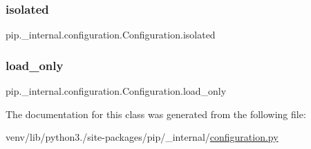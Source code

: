 \subsubsection{\texorpdfstring{isolated}{isolated}}
{\footnotesize\ttfamily pip.\+\_\+internal.\+configuration.\+Configuration.\+isolated}

\mbox{\label{classpip_1_1__internal_1_1configuration_1_1Configuration_a12c133cf8e1ac8bd7438014a7fd26dc7}} 
\subsubsection{\texorpdfstring{load\+\_\+only}{load\_only}}
{\footnotesize\ttfamily pip.\+\_\+internal.\+configuration.\+Configuration.\+load\+\_\+only}



The documentation for this class was generated from the following file\+:\begin{DoxyCompactItemize}
\item 
venv/lib/python3./site-\/packages/pip/\+\_\+internal/\hyperlink{configuration_8py}{configuration.\+py}\end{DoxyCompactItemize}

